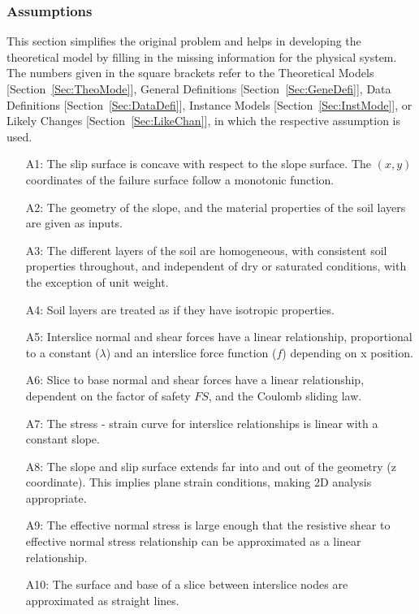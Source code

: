 \documentclass[12pt]{article}
\begin{document}
\subsubsection{Assumptions}
\label{Sec:Assu}
This section simplifies the original problem and helps in developing the theoretical model by filling in the missing information for the physical system. The numbers given in the square brackets refer to the Theoretical Models {[}Section~\ref{Sec:TheoMode}{]}, General Definitions {[}Section~\ref{Sec:GeneDefi}{]}, Data Definitions {[}Section~\ref{Sec:DataDefi}{]}, Instance Models {[}Section~\ref{Sec:InstMode}{]}, or Likely Changes {[}Section~\ref{Sec:LikeChan}{]}, in which the respective assumption is used.
\begin{itemize}
\item[A1:]The slip surface is concave with respect to the slope surface. The $(x,y)$ coordinates of the failure surface follow a monotonic function.
\item[A2:]The geometry of the slope, and the material properties of the soil layers are given as inputs.
\item[A3:]The different layers of the soil are homogeneous, with consistent soil properties throughout, and independent of dry or saturated conditions, with the exception of unit weight.
\item[A4:]Soil layers are treated as if they have isotropic properties.
\item[A5:]Interslice normal and shear forces have a linear relationship, proportional to a constant ($\lambda{}$) and an interslice force function ($f$) depending on x position.
\item[A6:]Slice to base normal and shear forces have a linear relationship, dependent on the factor of safety $FS$, and the Coulomb sliding law.
\item[A7:]The stress - strain curve for interslice relationships is linear with a constant slope.
\item[A8:]The slope and slip surface extends far into and out of the geometry (z coordinate). This implies plane strain conditions, making 2D analysis appropriate.
\item[A9:]The effective normal stress is large enough that the resistive shear to effective normal stress relationship can be approximated as a linear relationship.
\item[A10:]The surface and base of a slice between interslice nodes are approximated as straight lines.
\end{itemize}
\end{document}
